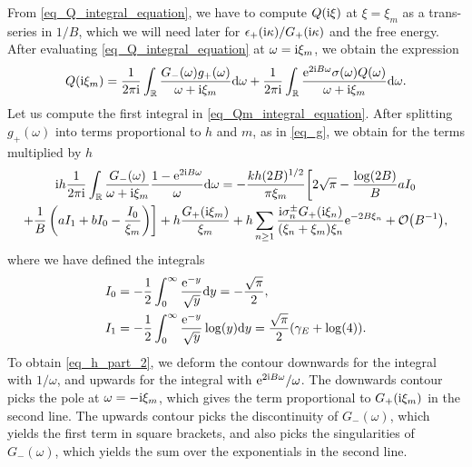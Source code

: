 \documentclass[a4paper,11pt]{article}
\theoremstyle{definition}
\newcommand{\re}{{\rm e}}
\newcommand{\ri}{{\rm i}}
\newcommand{\rd}{{\rm d}}
\begin{document}
From \eqref{eq_Q_integral_equation}, we have to compute $Q(\ri\xi)$ at $\xi=\xi_m$ as a trans-series in $1/B$, which we will need later for $\epsilon_+(\ri\kappa)/G_+(\ri\kappa)$ and the free energy. After evaluating \eqref{eq_Q_integral_equation} at $\omega=\ri\xi_m$, we obtain the expression
\begin{equation}
Q(\ri\xi_m)= \frac{1}{2 \pi \ri} \int_\mathbb{R} \frac{G_-(\omega) g_+(\omega)}{\omega+ \ri\xi_m} \rd \omega + \frac{1}{2 \pi \ri} \int_\mathbb{R} \frac{\re^{2 \ri B\omega} \sigma (\omega) Q(\omega)}{\omega+ \ri\xi_m} \rd \omega.
\label{eq_Qm_integral_equation}
\end{equation}
Let us compute the first integral in \eqref{eq_Qm_integral_equation}. After splitting $g_+(\omega)$ into terms proportional to $h$ and $m$, as in \eqref{eq_g}, we obtain for the terms multiplied by $h$ 
\begin{multline}
\ri h \frac{1}{2\pi\ri} \int_\mathbb{R} \frac{G_-(\omega)}{\omega + \ri\xi_m} \frac{1-\re^{2\ri B\omega}}{\omega} \rd \omega = -\frac{kh (2B)^{1/2}}{\pi \xi_m} \biggl[ 2 \sqrt{\pi} - \frac{\log(2B)}{B}a I_0\\
+ \frac{1}{B}\left( a I_1 + b I _0 - \frac{I_0}{\xi_m} \right) \biggr]
+ h \frac{G_+(\ri\xi_m)}{\xi_m} + h \sum_{n\ge 1} \frac{\ri \sigma^\pm_n G_+(\ri\xi_n)}{(\xi_n+\xi_m)\xi_n} \re^{-2B\xi_n} + \mathcal{O}\big(B^{-1}\big),
\label{eq_h_part_2}
\end{multline}
where we have defined the integrals
\begin{align}
I_0 &= -\frac{1}{2}\int_0^\infty \frac{\re^{-y}}{\sqrt{y}} \rd y = -\frac{\sqrt{\pi}}{2},\\
I_1 &= -\frac{1}{2}\int_0^\infty \frac{\re^{-y}}{\sqrt{y}}\log(y) \rd y = \frac{\sqrt{\pi}}{2}(\gamma_E+\log(4)).
\end{align}
To obtain \eqref{eq_h_part_2}, we deform the contour downwards for the integral with $1/\omega$, and upwards for the integral with $\re^{2\ri B \omega}/\omega$. The downwards contour picks the pole at $\omega = -\ri\xi_m$, which gives the term proportional to $G_+(\ri\xi_m)$ in the second line. The upwards contour picks the discontinuity of $G_-(\omega)$, which yields the first term in square brackets, and also picks the singularities of $G_-(\omega)$, which yields the sum over the exponentials in the second line. 
\end{document}
